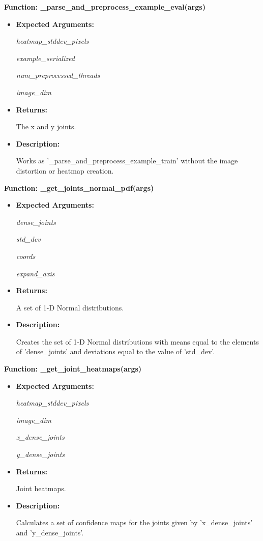 \documentclass{scrreprt}
\begin{document}
\textbf{Function: \_parse\_and\_preprocess\_example\_eval(args)}
\begin{itemize}
    \item \textbf{Expected Arguments:}

            \quad\textit{heatmap\_stddev\_pixels}

            \quad\textit{example\_serialized}

            \quad\textit{num\_preprocessed\_threads}

            \quad\textit{image\_dim}

    \item \textbf{Returns:}

            The x and y joints.

    \item \textbf{Description:}

            Works as '\_parse\_and\_preprocess\_example\_train' without the image distortion or heatmap creation.

\end{itemize}

\textbf{Function: \_get\_joints\_normal\_pdf(args)}
\begin{itemize}
    \item \textbf{Expected Arguments:}

            \quad\textit{dense\_joints}

            \quad\textit{std\_dev}

            \quad\textit{coords}

            \quad\textit{expand\_axis}

    \item \textbf{Returns:}

            A set of 1-D Normal distributions.

    \item \textbf{Description:}

            Creates the set of 1-D Normal distributions with means equal to the elements of 'dense\_joints' and deviations equal to the value of 'std\_dev'.

\end{itemize}

\textbf{Function: \_get\_joint\_heatmaps(args)}
\begin{itemize}
    \item \textbf{Expected Arguments:}

            \quad\textit{heatmap\_stddev\_pixels}

            \quad\textit{image\_dim}

            \quad\textit{x\_dense\_joints}

            \quad\textit{y\_dense\_joints}

    \item \textbf{Returns:}

            Joint heatmaps.

    \item \textbf{Description:}

            Calculates a set of confidence maps for the joints given by 'x\_dense\_joints' and 'y\_dense\_joints'.
\end{itemize}
\end{document}
